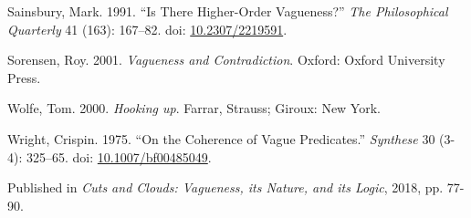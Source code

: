 \documentclass[
  11pt,
  letterpaper,
  DIV=11,
  numbers=noendperiod,
  twoside]{scrartcl}
\newlength{\cslhangindent}
\newenvironment{CSLReferences}[2] %
 {\begin{list}{}{%
  \setlength{\itemindent}{0pt}
  \setlength{\leftmargin}{0pt}
  \setlength{\parsep}{0pt}
  \ifodd #1
   \setlength{\leftmargin}{\cslhangindent}
   \setlength{\itemindent}{-1\cslhangindent}
  \fi
  \setlength{\itemsep}{#2\baselineskip}}}
 {\end{list}}
\begin{document}
\begin{CSLReferences}{1}{0}
Sainsbury, Mark. 1991. {``Is There Higher-Order Vagueness?''} \emph{The
Philosophical Quarterly} 41 (163): 167--82. doi:
\href{https://doi.org/10.2307/2219591}{10.2307/2219591}.

Sorensen, Roy. 2001. \emph{Vagueness and Contradiction}. Oxford: Oxford
University Press.

Wolfe, Tom. 2000. \emph{Hooking up}. Farrar, Strauss; Giroux: New York.

Wright, Crispin. 1975. {``On the Coherence of Vague Predicates.''}
\emph{Synthese} 30 (3-4): 325--65. doi:
\href{https://doi.org/10.1007/bf00485049}{10.1007/bf00485049}.

\end{CSLReferences}



\noindent Published in\emph{
Cuts and Clouds: Vagueness, its Nature, and its Logic}, 2018, pp. 77-90.
\end{document}
